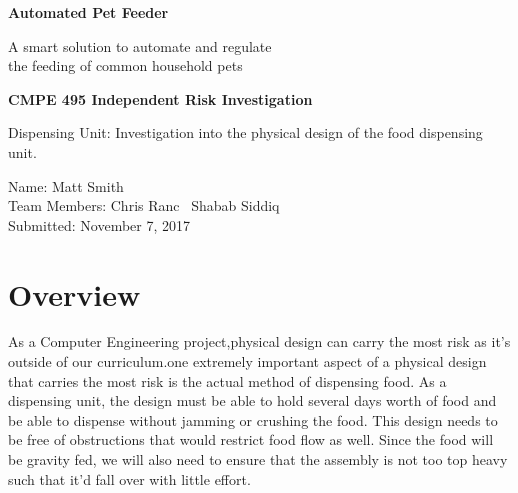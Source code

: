 \documentclass[12pt]{article}
\newcommand{\projectDescription}{A smart solution to automate and regulate \\the feeding of common household pets}
\newcommand{\projectTitle}{Automated Pet Feeder}
\newcommand{\yourname}{Matt Smith}
\newcommand{\myname}{Chris Ranc}
\newcommand{\anothername}{Shabab Siddiq}
\newcommand{\dateSubmitted}{November 7, 2017}
\newcommand{\componentDescription}{Dispensing Unit: Investigation into the physical design of the food dispensing unit.}
\begin{document}
    
\thispagestyle{empty}
    \vspace*{2.5cm} 
    \begin{center}
        \LARGE
        \textbf{\projectTitle}

        \Large
        \projectDescription

    \vspace*{2.5cm} 
        \large
        \textbf{CMPE 495 Independent Risk Investigation}

        \componentDescription
    \end{center}
    
    \vspace*{2cm}
    
    \begin{multicols}{2}
        \phantom{LaTeX doesn't like empty columns} %
        \columnbreak{}
        \begin{raggedright}
            
        Name: \yourname\\
        Team Members: \myname\
        \phantom{Team Members:} \anothername\\
        Submitted: \dateSubmitted\\
        \vspace{\baselineskip}
        \end{raggedright}
    \end{multicols}
\newpage
%
%
\renewcommand{\cftaftertoctitle}{\thispagestyle{empty}} 
\renewcommand\cftsecleader{\cftdotfill{\cftdotsep}}
\tableofcontents
\newpage

\section{Overview}
As a Computer Engineering project,physical design can carry the most risk as it's outside of our curriculum.one extremely important aspect of a physical design that carries the most risk is the actual method of dispensing food. As a dispensing unit, the design must be able to hold several days worth of food and be able to dispense without jamming or crushing the food. This design needs to be free of obstructions that would restrict food flow as well. Since the food will be gravity fed, we will also need to ensure that the assembly is not too top heavy such that it’d fall over with little effort.  
 
\end{document}
